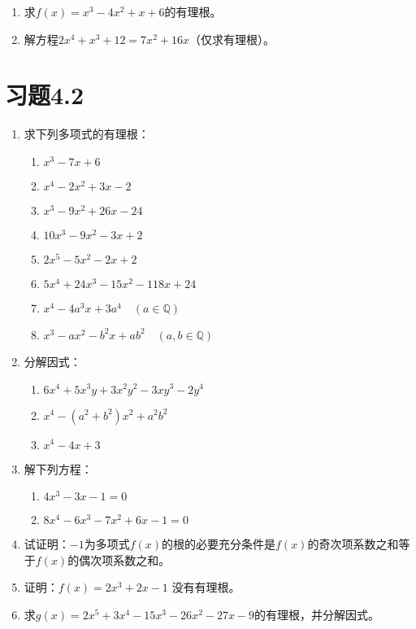 \begin{ex}
\begin{enumerate}
    \item 求$f(x)=x^3-4x^2+x+6$的有理根。
    \item 解方程$2x^4+x^3+12=7x^2+16x$（仅求有理根）。
\end{enumerate}
\end{ex}

\section*{习题4.2}
\begin{enumerate}
    \item 求下列多项式的有理根：
    \begin{multicols}{2}
  \begin{enumerate}
\item $x^3-7x+6$
\item $x^4-2x^2+3x-2$
\item $x^3-9x^2+26x-24$
\item $10x^3-9x^2-3x+2$
\item $2x^5-5x^2-2x+2$
\item $5x^4+24x^3-15x^2-118x+24$
\item $x^4-4a^3x+3a^4\quad (a\in\mathbb{Q})$
\item $x^3-ax^2-b^2x+ab^2\quad (a,b\in\mathbb{Q})$
\end{enumerate}      
    \end{multicols}
\item 分解因式：
\begin{enumerate}
    \item $6x^4+5x^3y+3x^2y^2-3xy^3-2y^4$
    \item $x^4-(a^2+b^2)x^2 +a^2b^2$
    \item $x^4-4x+3$
\end{enumerate}

\item 解下列方程：
\begin{enumerate}
    \item $4x^3-3x-1=0$
\item $8x^4-6x^3-7x^2+6x-1=0$
\end{enumerate}

\item 试证明：$-1$为多项式$f(x)$的根的必要充分条件是$f(x)$的奇次项系数之和等于$f(x)$的偶次项系数之和。

\item 证明：$f(x)=2x^3+2x-1$ 没有有理根。
\item 求$g(x)=2x^5+3x^4-15x^3-26x^2-27x-9$的有理根，并分解因式。
\end{enumerate}
    
